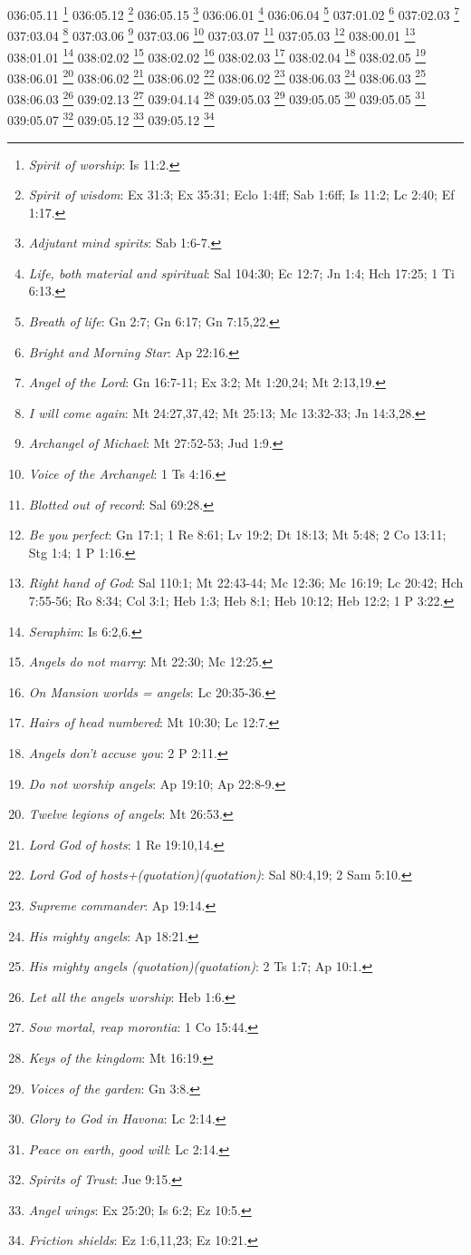 {036:05.11 \footnote{\textit{Spirit of worship}: Is 11:2.}
036:05.12 \footnote{\textit{Spirit of wisdom}: Ex 31:3; Ex 35:31; Eclo 1:4ff; Sab 1:6ff; Is 11:2; Lc 2:40; Ef 1:17.}
036:05.15 \footnote{\textit{Adjutant mind spirits}: Sab 1:6-7.}
036:06.01 \footnote{\textit{Life, both material and spiritual}: Sal 104:30; Ec 12:7; Jn 1:4; Hch 17:25; 1 Ti 6:13.}
036:06.04 \footnote{\textit{Breath of life}: Gn 2:7; Gn 6:17; Gn 7:15,22.}
037:01.02 \footnote{\textit{Bright and Morning Star}: Ap 22:16.}
037:02.03 \footnote{\textit{Angel of the Lord}: Gn 16:7-11; Ex 3:2; Mt 1:20,24; Mt 2:13,19.}
037:03.04 \footnote{\textit{I will come again}: Mt 24:27,37,42; Mt 25:13; Mc 13:32-33; Jn 14:3,28.}
037:03.06 \footnote{\textit{Archangel of Michael}: Mt 27:52-53; Jud 1:9.}
037:03.06 \footnote{\textit{Voice of the Archangel}: 1 Ts 4:16.}
037:03.07 \footnote{\textit{Blotted out of record}: Sal 69:28.}
037:05.03 \footnote{\textit{Be you perfect}: Gn 17:1; 1 Re 8:61; Lv 19:2; Dt 18:13; Mt 5:48; 2 Co 13:11; Stg 1:4; 1 P 1:16.}
038:00.01 \footnote{\textit{Right hand of God}: Sal 110:1; Mt 22:43-44; Mc 12:36; Mc 16:19; Lc 20:42; Hch 7:55-56; Ro 8:34; Col 3:1; Heb 1:3; Heb 8:1; Heb 10:12; Heb 12:2; 1 P 3:22.}
038:01.01 \footnote{\textit{Seraphim}: Is 6:2,6.}
038:02.02 \footnote{\textit{Angels do not marry}: Mt 22:30; Mc 12:25.}
038:02.02 \footnote{\textit{On Mansion worlds = angels}: Lc 20:35-36.}
038:02.03 \footnote{\textit{Hairs of head numbered}: Mt 10:30; Lc 12:7.}
038:02.04 \footnote{\textit{Angels don't accuse you}: 2 P 2:11.}
038:02.05 \footnote{\textit{Do not worship angels}: Ap 19:10; Ap 22:8-9.}
038:06.01 \footnote{\textit{Twelve legions of angels}: Mt 26:53.}
038:06.02 \footnote{\textit{Lord God of hosts}: 1 Re 19:10,14.}
038:06.02 \footnote{\textit{Lord God of hosts+(quotation)(quotation)}: Sal 80:4,19; 2 Sam 5:10.}
038:06.02 \footnote{\textit{Supreme commander}: Ap 19:14.}
038:06.03 \footnote{\textit{His mighty angels}: Ap 18:21.}
038:06.03 \footnote{\textit{His mighty angels (quotation)(quotation)}: 2 Ts 1:7; Ap 10:1.}
038:06.03 \footnote{\textit{Let all the angels worship}: Heb 1:6.}
039:02.13 \footnote{\textit{Sow mortal, reap morontia}: 1 Co 15:44.}
039:04.14 \footnote{\textit{Keys of the kingdom}: Mt 16:19.}
039:05.03 \footnote{\textit{Voices of the garden}: Gn 3:8.}
039:05.05 \footnote{\textit{Glory to God in Havona}: Lc 2:14.}
039:05.05 \footnote{\textit{Peace on earth, good will}: Lc 2:14.}
039:05.07 \footnote{\textit{Spirits of Trust}: Jue 9:15.}
039:05.12 \footnote{\textit{Angel wings}: Ex 25:20; Is 6:2; Ez 10:5.}
039:05.12 \footnote{\textit{Friction shields}: Ez 1:6,11,23; Ez 10:21.}
}
